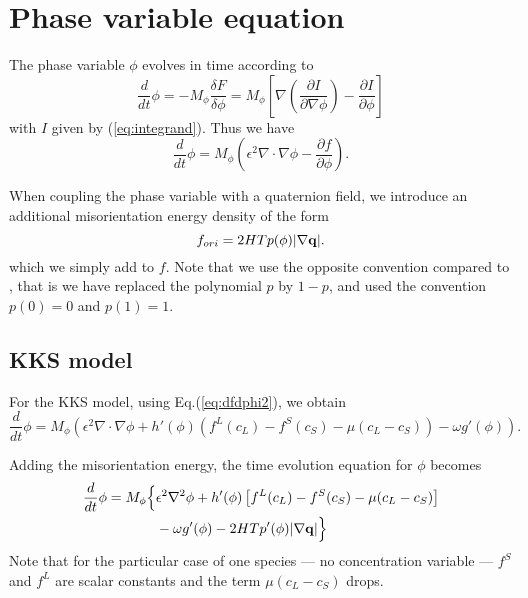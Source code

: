 %
\section{Phase variable equation}

The phase variable $\phi$ evolves in time according to
%
\begin{equation}
  \frac{d}{dt}\phi=-M_\phi\frac{\delta F}{\delta\phi} = M_\phi
  \left[\nabla\left(\frac{\partial I}{\partial\nabla\phi}\right)-
  \frac{\partial I}{\partial\phi}\right]
\label{eq:phi_evolution}
\end{equation}
%
with $I$ given by (\ref{eq:integrand}). Thus we have
%
\begin{equation}
  \frac{d}{dt}\phi=M_\phi\left(\epsilon^2\nabla\cdot\nabla\phi-
  \frac{\partial f}{\partial\phi}\right).
\label{eq:dphidt}
\end{equation}

When coupling the phase variable with a quaternion field, we
introduce an additional misorientation energy density of the form
\cite{0295-5075-71-1-131}
%
\begin{equation}
  f_{ori} = 2 H T p(\phi) | \nabla {\bf q} |.
\label{eq:fori}
\end{equation}
%
which we simply add to $f$.
Note that we use the opposite convention compared to
\cite{0295-5075-71-1-131}, that is we have replaced the polynomial
$p$ by $1-p$, and used the convention $p(0)=0$ and $p(1)=1$.

\subsection{KKS model}

For the KKS model, using Eq.(\ref{eq:dfdphi2}), we obtain
%
\begin{equation}
  \frac{d}{dt}\phi=M_\phi\left(\epsilon^2\nabla\cdot\nabla\phi
  +h'(\phi)\left(f^L(c_L)-f^S(c_S)-\mu(c_L-c_S)\right)-\omega
  g'(\phi)\right).
\label{eq:dphidt2}
\end{equation}

Adding the misorientation energy, 
the time evolution equation for $\phi$ becomes
%
\begin{equation}
\begin{split}
  \frac{d}{dt}\phi =
  M_\phi\Big\{ & \epsilon^2 \nabla^2 \phi
  + h'(\phi)\left[ f^L(c_L) - f^S(c_S) - \mu (c_L - c_S) \right]
  \\
  & - \omega g'(\phi) - 2HTp'(\phi) | \nabla {\bf q} | \Big\}
\label{eq:dphidtwithq}
\end{split}
\end{equation}
%
Note that for the particular case of one species --- no
concentration variable --- $f^S$ and $f^L$ are scalar constants
and the term $\mu(c_L-c_S)$ drops.

